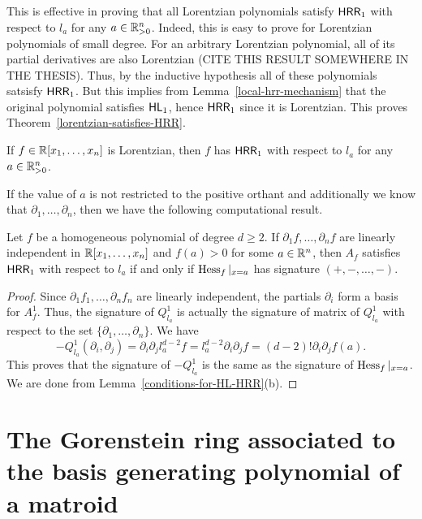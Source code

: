 \documentclass{puthesis-UG}
\begin{document}
This is effective in proving that all Lorentzian polynomials satisfy $\mathsf{HRR}_1$ with respect to $l_a$ for any $a \in \mathbb{R}^n_{> 0}$. Indeed, this is easy to prove for Lorentzian polynomials of small degree. For an arbitrary Lorentzian polynomial, all of its partial derivatives are also Lorentzian (CITE THIS RESULT SOMEWHERE IN THE THESIS). Thus, by the inductive hypothesis all of these polynomials satsisfy $\mathsf{HRR}_1$. But this implies from Lemma~\ref{local-hrr-mechanism} that the original polynomial satisfies $\mathsf{HL}_1$, hence $\mathsf{HRR}_1$ since it is Lorentzian. This proves Theorem~\ref{lorentzian-satisfies-HRR}.

\begin{thm}  \label{lorentzian-satisfies-HRR}
	If $f \in \mathbb{R}[x_1, \ldots, x_n]$ is Lorentzian, then $f$ has $\mathsf{HRR}_1$ with respect to $l_a$ for any $a \in \mathbb{R}_{> 0}^n$. 
\end{thm}

If the value of $a$ is not restricted to the positive orthant and additionally we know that $\partial_1, \ldots, \partial_n$, then we have the following computational result. 

\begin{cor} \label{partial-independent-implies-hessian}
	Let $f$ be a homogeneous polynomial of degree $d \geq 2$. If $\partial_1 f, \ldots, \partial_n f$ are linearly independent in $\mathbb{R}[x_1, \ldots, x_n]$ and $f(a) > 0$ for some $a \in \mathbb{R}^n$, then $A_f$ satisfies $\mathsf{HRR}_1$ with respect to $l_a$ if and only if $\operatorname{Hess}_f|_{x = a}$ has signature $(+, -, \ldots, -)$. 
\end{cor}

\begin{proof}
	Since $\partial_1 f_1, \ldots, \partial_n f_n$ are linearly independent, the partials $\partial_i$ form a basis for $A_f^1$. Thus, the signature of $Q_{l_a}^1$ is actually the signature of matrix of $Q_{l_a}^1$ with respect to the set $\{\partial_1, \ldots, \partial_n\}.$ We have 
	\[
		-Q_{l_a}^1(\partial_i, \partial_j) = \partial_i \partial_j l_a^{d-2} f =  l_a^{d-2} \partial_i \partial_j f = (d-2)! \partial_i \partial_j f(a).
	\]
	This proves that the signature of $-Q^1_{l_a}$ is the same as the signature of $\operatorname{Hess}_f |_{x = a}$.  We are done from Lemma~\ref{conditions-for-HL-HRR}(b).
\end{proof}
\section{The Gorenstein ring associated to the basis generating polynomial of a matroid}
\end{document}
